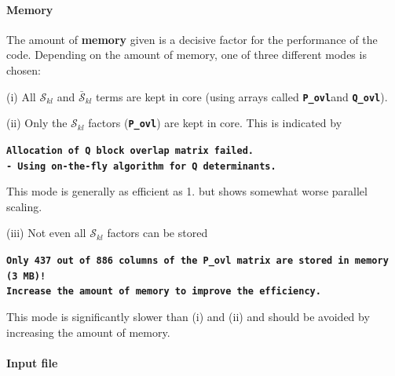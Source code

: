 \documentclass[a4paper,10pt,DIV=15,openany,twoside=false]{scrbook}
\newcommand{\ttt}[1]{\textbf{\texttt{#1}}}
\newenvironment{example}{
  \setlength{\OuterFrameSep}{3pt}
  \vspace{0mm}
  \definecolor{shadecolor}{HTML}{E4F4FF}
  \begin{shaded}
}{
  \end{shaded}
}
\begin{document}
\paragraph{Memory}

The amount of \textbf{memory} given is a decisive factor for the performance of the code.
Depending on the amount of memory, one of three different modes is chosen:

(i) All $\mathcal{S}_{kl}$ and $\bar{\mathcal{S}}_{kl}$ terms are kept in core (using arrays called \ttt{P\_ovl}and \ttt{Q\_ovl}).

(ii) Only the $\mathcal{S}_{kl}$ factors (\ttt{P\_ovl}) are kept in core. This is indicated by
\begin{example}
\ttt{Allocation of Q block overlap matrix failed.\\
  - Using on-the-fly algorithm for Q determinants.}
\end{example}
This mode is generally as efficient as 1. but shows somewhat worse parallel scaling.

(iii) Not even all $\mathcal{S}_{kl}$ factors can be stored
\begin{example}
\ttt{Only 437 out of 886 columns of the P\_ovl matrix are stored in memory (3 MB)!\\
 Increase the amount of memory to improve the efficiency.}
\end{example}
This mode is significantly slower than (i) and (ii) and should be avoided by increasing the amount of memory.

\paragraph{Input file}
\end{document}
